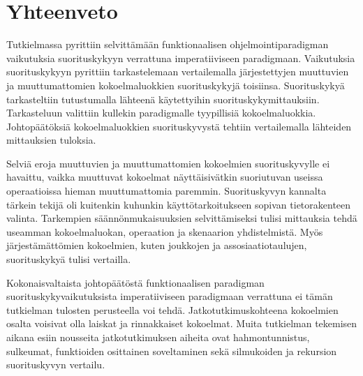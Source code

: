 \chapter{Yhteenveto} \label{Yhteenveto}
Tutkielmassa pyrittiin selvittämään funktionaalisen ohjelmointiparadigman vaikutuksia suorituskykyyn verrattuna imperatiiviseen paradigmaan. Vaikutuksia suorituskykyyn pyrittiin tarkastelemaan vertailemalla järjestettyjen muuttuvien ja muuttumattomien kokoelmaluokkien suorituskykyjä toisiinsa. Suorituskykyä tarkasteltiin tutustumalla lähteenä käytettyihin suorituskykymittauksiin. Tarkasteluun valittiin kullekin paradigmalle tyypillisiä kokoelmaluokkia. Johtopäätöksiä kokoelmaluokkien suorituskyvystä tehtiin vertailemalla lähteiden mittauksien tuloksia. 

Selviä eroja muuttuvien ja muuttumattomien kokoelmien suorituskyvylle ei havaittu, vaikka muuttuvat kokoelmat näyttäisivätkin suoriutuvan useissa operaatioissa hieman muuttumattomia paremmin. Suorituskyvyn kannalta tärkein tekijä oli kuitenkin kuhunkin käyttötarkoitukseen sopivan tietorakenteen valinta. Tarkempien säännönmukaisuuksien selvittämiseksi tulisi mittauksia tehdä useamman kokoelmaluokan, operaation ja skenaarion yhdistelmistä. Myös järjestämättömien kokoelmien, kuten joukkojen ja assosiaatiotaulujen, suorituskykyä tulisi vertailla.

Kokonaisvaltaista johtopäätöstä funktionaalisen paradigman suorituskykyvaikutuksista imperatiiviseen paradigmaan verrattuna ei tämän tutkielman tulosten perusteella voi tehdä. Jatkotutkimuskohteena kokoelmien osalta voisivat olla laiskat ja rinnakkaiset kokoelmat. Muita tutkielman tekemisen aikana esiin nousseita jatkotutkimuksen aiheita ovat hahmontunnistus, sulkeumat, funktioiden osittainen soveltaminen sekä silmukoiden ja rekursion suorituskyvyn vertailu.
